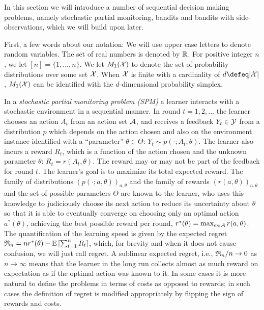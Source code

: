 
In this section we will introduce a number of sequential decision making problems,
namely stochastic partial monitoring, bandits and bandits with side-observations, which we will build upon later.

First, a few words about our notation: We will use upper case letters to denote random variables.
The set of real numbers is denoted by $\mathbb{R}$. For positive integer $n$, we let
$[n] = \{1,\dots,n\}$. %
We let $M_1(\mathcal{X})$ to denote the set of probability distributions over some set $\mathcal{X}$.
When $\mathcal{X}$ is finite with a cardinality of $d \defeq |\X|$, 
$M_1(\mathcal{X})$ can be identified with the $d$-dimensional probability simplex.

%
In a \emph{stochastic partial monitoring problem (SPM)} a learner interacts with a stochastic environment in a sequential manner.
In round $t=1,2,\dots$ the learner chooses an action $A_t$ from an action set $\mathcal{A}$, and receives a feedback $Y_t\in \mathcal{Y}$
from a distribution $p$ which depends on the action chosen and also on the environment instance identified
with a ``parameter'' $\theta\in\Theta$:
$Y_t \sim p(\cdot;A_t,\theta)$. 
The learner also incurs a reward $R_t$, which is a function of the action chosen and the unknown parameter $\theta$:
$R_t = r(A_t,\theta)$. 
The reward may or may not be part of the feedback for round $t$.
The learner's goal is to maximize its total expected reward.
The family of distributions $(p(\cdot;a,\theta))_{a,\theta}$ and the family of rewards $(r(a,\theta))_{a,\theta}$
and the set of possible parameters $\Theta$ are known to the learner, who uses this knowledge to judiciously choose
its next action to reduce its uncertainty about $\theta$ so that it is able to eventually converge on choosing only an 
optimal action $a^*(\theta)$, achieving the best possible reward per round, $r^*(\theta) = \max_{a\in \mathcal{A}} r(a,\theta)$.
The quantification of the learning speed is given by the expected regret 
$\mathfrak{R}_n = n r^*(\theta) - \mathbb{E}\left[\sum_{t=1}^n R_t\right]$, which, for brevity and when it does not cause confusion, 
we will just call regret.
A sublinear expected regret, i.e., $\mathfrak{R}_n/n \to 0$ as $n\to \infty$ means that the learner in the long run collects
almost as much reward on expectation as if the optimal action was known to it.
In some cases it is more natural to define the problems in terms of costs as opposed to rewards;
in such cases the definition of regret is modified appropriately by flipping the sign of rewards and costs. 

